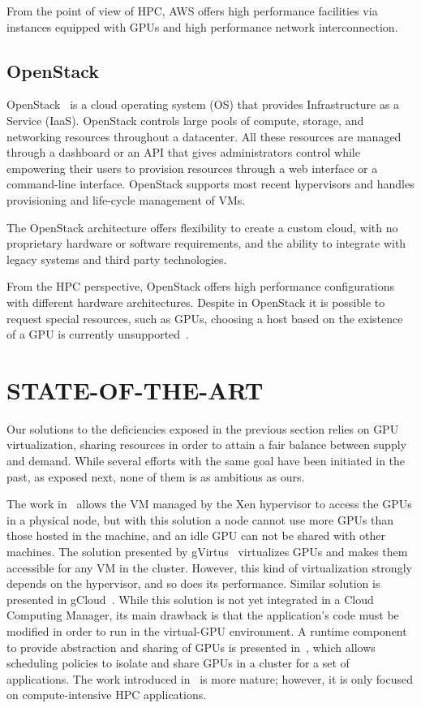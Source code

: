 \documentclass[a4paper,twoside]{article}
\begin{document}
From the point of view of HPC, AWS offers high performance facilities via 
instances equipped with GPUs and high performance network interconnection.

\subsection{OpenStack}
\label{sec:openstack}

OpenStack~\cite{OpenStack} is a cloud operating system (OS) that provides Infrastructure as a Service (IaaS). 
OpenStack controls large pools of compute, storage, and networking resources throughout a 
datacenter. All these resources are managed through a dashboard or an API that gives administrators 
control while empowering their users to provision resources through a web interface
or a command-line interface.  
OpenStack supports most recent hypervisors and handles provisioning 
and life-cycle management of VMs.
 
The OpenStack architecture offers flexibility to create a custom cloud, with no proprietary hardware
or software requirements, and the ability to integrate with legacy systems and third party technologies. 

From the HPC perspective, OpenStack offers high performance configurations with different hardware architectures. Despite in OpenStack it is possible to 
request special resources, such as GPUs, choosing a host based on the existence
of a GPU is currently unsupported~\cite{OpenStackGPU}. 

\section{\uppercase{State-of-the-Art}}
\label{sec:state}
Our solutions to the deficiencies exposed in the previous section relies on GPU virtualization, sharing resources in order
to attain a fair balance between supply and demand. 
While several efforts with the same goal have been initiated in the past, as exposed next, 
none of them is as ambitious as ours. 

The work in~\cite{younge2013enabling} allows the VM managed
by the Xen hypervisor to access the GPUs in a physical
node, but with this solution a node cannot 
use more GPUs than those hosted in the machine, and an idle GPU can not be shared with other machines. The solution presented 
by gVirtus~\cite{gvirtus} virtualizes GPUs and makes
them accessible for any VM in the cluster. However, this kind
of virtualization strongly depends on the hypervisor, and so
does its performance. Similar solution is presented in gCloud~\cite{diab2013dynamic}. 
While this solution is not yet integrated in a Cloud Computing Manager, its main
drawback is that the application's code must be modified
in order to run in the virtual-GPU environment. A runtime component to provide abstraction
and sharing of GPUs is presented in~\cite{becchi2012virtual}, which allows scheduling policies 
to isolate and share GPUs in a cluster for a set of applications. 
The work introduced in~\cite{jungpgpu} is more mature; however,
it is only focused on compute-intensive HPC applications. 
\end{document}
